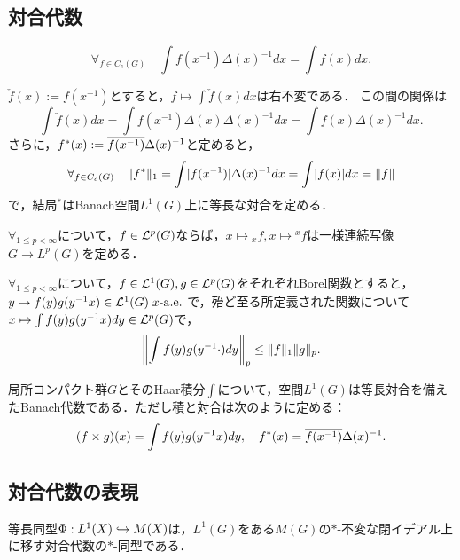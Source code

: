 \documentclass[uplatex,dvipdfmx]{jsreport}
\begin{document}
\subsection{対合代数}

\begin{lemma}
    \[\forall_{f\in C_c(G)}\quad\int f(x^{-1})\Delta(x)^{-1}dx=\int f(x)dx.\]
\end{lemma}

\begin{discussion}
    $\check{f}(x):=f(x^{-1})$とすると，$f\mapsto\int\check{f}(x)dx$は右不変である．
    この間の関係は
    \[\int\check{f}(x)dx=\int f(x^{-1})\Delta(x)\Delta(x)^{-1}dx=\int f(x)\Delta(x)^{-1}dx.\]
    さらに，$f^*(x):=\overline{f(x^{-1})}\Delta(x)^{-1}$と定めると，
    \[\forall_{f\in C_c(G)}\quad\|f^*\|_1=\int\lvert f(x^{-1})\rvert\Delta(x)^{-1}dx=\int\lvert f(x)\rvert dx=\|f\|\]
    で，結局${}^*$はBanach空間$L^1(G)$上に等長な対合を定める．
\end{discussion}

\begin{proposition}
    $\forall_{1\le p<\infty}$について，$f\in\mathcal{L}^p(G)$ならば，$x\mapsto{}_xf,x\mapsto{}^xf$は一様連続写像$G\to L^p(G)$を定める．
\end{proposition}

\begin{proposition}
    $\forall_{1\le p<\infty}$について，$f\in\mathcal{L}^1(G),g\in\mathcal{L}^p(G)$をそれぞれBorel関数とすると，$y\mapsto f(y)g(y^{-1}x)\in\mathcal{L}^1(G)\;x\text{-}\mathrm{a.e.}\;$で，殆ど至る所定義された関数について$x\mapsto\int f(y)g(y^{-1}x)dy\in\mathcal{L}^p(G)$で，
    \[\left\|\int f(y)g(y^{-1}\cdot)dy\right\|_p\le\|f\|_1\|g\|_p.\]
\end{proposition}

\begin{theorem}
    局所コンパクト群$G$とそのHaar積分$\int$について，空間$L^1(G)$は等長対合を備えたBanach代数である．ただし積と対合は次のように定める：
    \[(f\times g)(x)=\int f(y)g(y^{-1}x)dy,\quad f^*(x)=\overline{f(x^{-1})}\Delta(x)^{-1}.\]
\end{theorem}

\subsection{対合代数の表現}

\begin{proposition}
    等長同型$\Phi:L^1(X)\hookrightarrow M(X)$は，$L^1(G)$をある$M(G)$の$*$-不変な閉イデアル上に移す対合代数の$*$-同型である．
\end{proposition}
\end{document}
